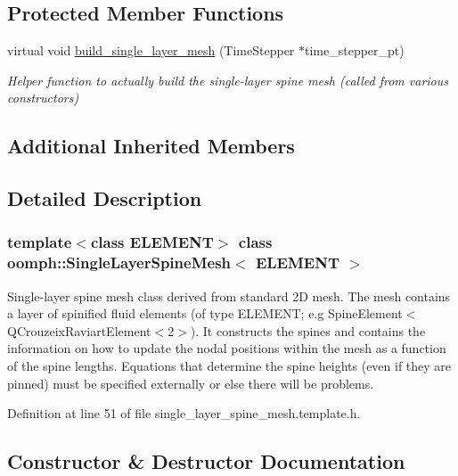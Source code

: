 \subsection*{Protected Member Functions}
\begin{DoxyCompactItemize}
\item 
virtual void \hyperlink{classoomph_1_1SingleLayerSpineMesh_a6829fa8216137c0e2f5eb40b389dda35}{build\+\_\+single\+\_\+layer\+\_\+mesh} (Time\+Stepper $\ast$time\+\_\+stepper\+\_\+pt)
\begin{DoxyCompactList}\small\item\em Helper function to actually build the single-\/layer spine mesh (called from various constructors) \end{DoxyCompactList}\end{DoxyCompactItemize}
\subsection*{Additional Inherited Members}


\subsection{Detailed Description}
\subsubsection*{template$<$class E\+L\+E\+M\+E\+NT$>$\newline
class oomph\+::\+Single\+Layer\+Spine\+Mesh$<$ E\+L\+E\+M\+E\+N\+T $>$}

Single-\/layer spine mesh class derived from standard 2D mesh. The mesh contains a layer of spinified fluid elements (of type E\+L\+E\+M\+E\+NT; e.\+g Spine\+Element$<$Q\+Crouzeix\+Raviart\+Element$<$2$>$). It constructs the spines and contains the information on how to update the nodal positions within the mesh as a function of the spine lengths. Equations that determine the spine heights (even if they are pinned) must be specified externally or else there will be problems. 

Definition at line 51 of file single\+\_\+layer\+\_\+spine\+\_\+mesh.\+template.\+h.



\subsection{Constructor \& Destructor Documentation}
\mbox{\label{classoomph_1_1SingleLayerSpineMesh_a2cdbf36114a4da773fb7d659218d09cb}} 
